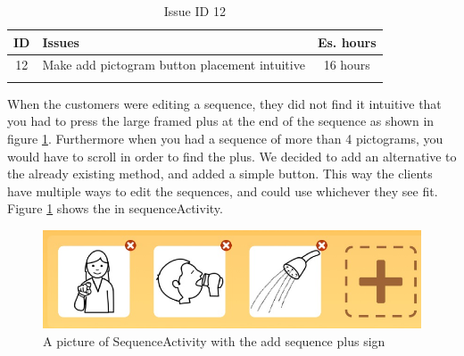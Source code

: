 \begin{longtable} { | c | p{12cm} | c | } 
\hline
	ID 	&	Issues	&		 Es. hours \\\hline
	12 	&	Make add pictogram button placement intuitive	&	16 hours \\\hline
\caption{Issue ID 12}
\label{tab:spr3_addsequencenotintuitive}
\end{longtable}

When the customers were editing a sequence, they did not find it intuitive that you had to press the large framed plus at the end of the sequence as shown in figure \ref{fig:Old_editSequence}. Furthermore when you had a sequence of more than 4 pictograms, you would have to scroll in order to find the plus. We decided to add an alternative to the already existing method, and added a simple button. This way the clients have multiple ways to edit the sequences, and could use whichever they see fit. Figure \ref{fig:Old_editSequence} shows the  in sequenceActivity.

\begin{figure} [h!]
\centering
\includegraphics[width=.9\textwidth]{Pics/Sprint3/editSequence}
\caption{A picture of SequenceActivity with the add sequence plus sign}
\label{fig:Old_editSequence}
\end{figure}